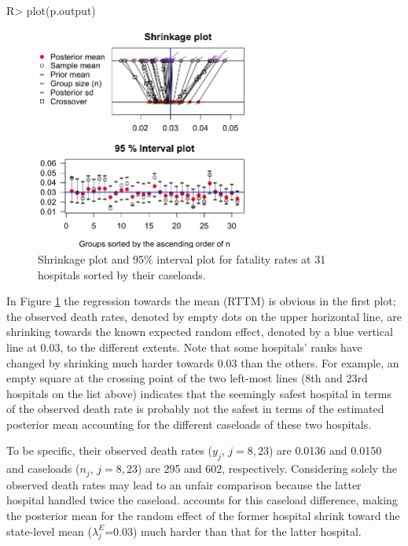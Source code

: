 \documentclass[article]{jss}
\begin{document}
\begin{CodeChunk}
\begin{CodeInput}
R> plot(p.output)
\end{CodeInput}
\end{CodeChunk}
\begin{figure}[h]
\begin{center}
\includegraphics[width = 2.8in]{hospital1.png}
\caption{Shrinkage plot and 95\% interval plot for fatality rates at 31 hospitals sorted by their caseloads.}
\label{fig:hospshr}
\end{center}
\end{figure}

In Figure \ref{fig:hospshr} the regression towards the mean (RTTM) is obvious in the first plot; the observed death rates, denoted by empty dots on the upper horizontal line, are shrinking towards the known expected random effect, denoted by a blue vertical line at 0.03, to the different extents. Note that some hospitals' ranks have changed by shrinking much harder towards 0.03 than the others. For example, an empty square at the crossing point of the two left-most lines (8th and 23rd hospitals on the list above) indicates that  the seemingly safest hospital in terms of the observed death rate is probably not the safest in terms of the estimated posterior mean accounting for the different caseloads of these two hospitals. 

To be specific, their observed death rates ($y_{j}$, $j=8, 23$) are 0.0136 and 0.0150 and caseloads ($n_{j}$, $j=8, 23$) are 295 and 602, respectively. Considering solely the observed death rates may lead to an unfair comparison because the latter hospital handled twice the caseload.  accounts for this caseload difference, making the posterior mean for the random effect of the former hospital shrink toward the state-level mean ($\lambda^E_j$=0.03) much harder than that for the latter hospital.
\end{document}

